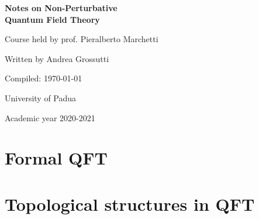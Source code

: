 \documentclass[a4paper]{report}
\newcommand{\onlyinsubfile}[1]{#1}
\newcommand{\onlyinmainfile}[1]{

\skipline

\textsf{\color{red} Part of the text is omitted from the compiled subfile, in order to make the compilation faster. You can find it in the main file. To avoid this, remove `` \textnormal{\textbackslash onlyinmainfile\{\ldots\}}'' from the code.}

\skipline

}
\begin{document}
\renewcommand{\onlyinsubfile}[1]{}
\renewcommand{\onlyinmainfile}[1]{#1}

\begin{titlepage}
\begin{center}
       \vspace*{5cm}
       \textbf{\Huge Notes on Non-Perturbative\\[0.3em]
       Quantum Field Theory}
       
       \vspace{1cm}
        {\LARGE Course held by prof. Pieralberto Marchetti}
        
        \vspace{1.5cm}
        {\Large Written by Andrea Grossutti}   
                 
       \vfill
       {\large Compiled: \today} 
           
       \vspace{2cm}        
       {\large University of Padua}  
        
       \vspace{0.8cm}
       {\large Academic year 2020-2021}
\end{center}
\end{titlepage}

\tableofcontents

\part{Formal QFT}





\part{Topological structures in QFT}




\nocite{*}
\printbibliography
\end{document}
